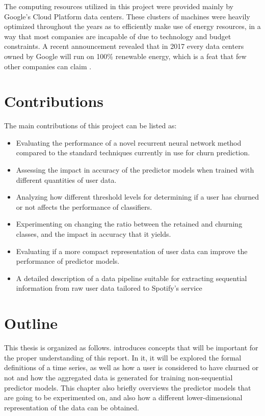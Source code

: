 \documentclass{kththesis}
\begin{document}
The computing resources utilized in this project were provided mainly by Google's Cloud Platform data centers. These clusters of machines were heavily optimized throughout the years as to efficiently make use of energy resources, in a way that most companies are incapable of due to technology and budget constraints. A recent announcement revealed that in 2017 every data centers owned by Google will run on 100\% renewable energy, which is a feat that few other companies can claim \citep{google2017renew}.  


\section{Contributions}

The main contributions of this project can be listed as:

\begin{itemize}
\item Evaluating the performance of a novel recurrent neural network method compared to the standard techniques currently in use for churn prediction.
\item Assessing the impact in accuracy of the predictor models when trained with different quantities of user data.
\item Analyzing how different threshold levels for determining if a user has churned or not affects the performance of classifiers.
\item Experimenting on changing the ratio between the retained and churning classes, and the impact in accuracy that it yields.
\item Evaluating if a more compact representation of user data can improve the performance of predictor models.
\item A detailed description of a data pipeline suitable for extracting sequential information from raw user data tailored to Spotify's service
\end{itemize}

\section{Outline}

This thesis is organized as follows.  introduces concepts that will be important for the proper understanding of this report. In it, it will be explored the formal definitions of a time series, as well as how a user is considered to have churned or not and how the aggregated data is generated for training non-sequential predictor models. This chapter also briefly overviews the predictor models that are going to be experimented on, and also how a different lower-dimensional representation of the data can be obtained.
\end{document}
